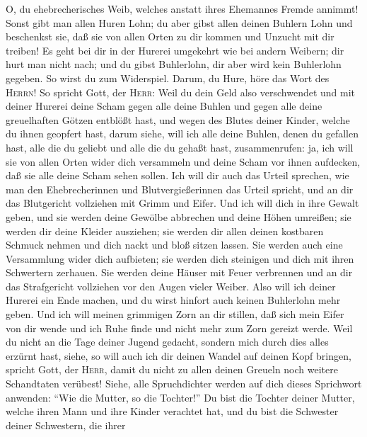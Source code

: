  O, du ehebrecherisches Weib, welches anstatt ihres
Ehemannes Fremde annimmt!  Sonst gibt man allen Huren
Lohn; du aber gibst allen deinen Buhlern Lohn und beschenkst sie, daß
sie von allen Orten zu dir kommen und Unzucht mit dir treiben!
 Es geht bei dir in der Hurerei umgekehrt wie bei andern
Weibern; dir hurt man nicht nach; und du gibst Buhlerlohn, dir aber wird
kein Buhlerlohn gegeben. So wirst du zum Widerspiel. 
Darum, du Hure, höre das Wort des \textsc{Herrn}!  So
spricht Gott, der \textsc{Herr}: Weil du dein Geld also verschwendet und
mit deiner Hurerei deine Scham gegen alle deine Buhlen und gegen alle
deine greuelhaften Götzen entblößt hast, und wegen des Blutes deiner
Kinder, welche du ihnen geopfert hast,  darum siehe, will
ich alle deine Buhlen, denen du gefallen hast, alle die du geliebt und
alle die du gehaßt hast, zusammenrufen: ja, ich will sie von allen Orten
wider dich versammeln und deine Scham vor ihnen aufdecken, daß sie alle
deine Scham sehen sollen.  Ich will dir auch das Urteil
sprechen, wie man den Ehebrecherinnen und Blutvergießerinnen das Urteil
spricht, und an dir das Blutgericht vollziehen mit Grimm und Eifer.
 Und ich will dich in ihre Gewalt geben, und sie werden
deine Gewölbe abbrechen und deine Höhen umreißen; sie werden dir deine
Kleider ausziehen; sie werden dir allen deinen kostbaren Schmuck nehmen
und dich nackt und bloß sitzen lassen.  Sie werden auch
eine Versammlung wider dich aufbieten; sie werden dich steinigen und
dich mit ihren Schwertern zerhauen.  Sie werden deine
Häuser mit Feuer verbrennen und an dir das Strafgericht vollziehen vor
den Augen vieler Weiber. Also will ich deiner Hurerei ein Ende machen,
und du wirst hinfort auch keinen Buhlerlohn mehr geben. 
Und ich will meinen grimmigen Zorn an dir stillen, daß sich mein Eifer
von dir wende und ich Ruhe finde und nicht mehr zum Zorn gereizt werde.
 Weil du nicht an die Tage deiner Jugend gedacht, sondern
mich durch dies alles erzürnt hast, siehe, so will auch ich dir deinen
Wandel auf deinen Kopf bringen, spricht Gott, der \textsc{Herr}, damit
du nicht zu allen deinen Greueln noch weitere Schandtaten verübest!
 Siehe, alle Spruchdichter werden auf dich dieses
Sprichwort anwenden: ``Wie die Mutter, so die Tochter!'' 
Du bist die Tochter deiner Mutter, welche ihren Mann und ihre Kinder
verachtet hat, und du bist die Schwester deiner Schwestern, die ihrer
